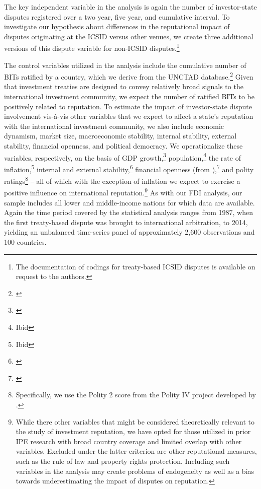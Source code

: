 \documentclass[12pt,onesided]{amsart}
\begin{document}
The key independent variable in the analysis is again the number of investor-state disputes registered over a two year, five year, and cumulative interval. To investigate our hypothesis about differences in the reputational impact of disputes originating at the ICSID versus other venues, we create three additional versions of this dispute variable for non-ICSID disputes.\footnote{The documentation of codings for treaty-based ICSID disputes is available on request to the authors.} 

 The control variables utilized in the analysis include the cumulative number of BITs ratified by a country, which we derive from the UNCTAD database.\footnote{\citet{unctad:2013c}} Given that investment treaties are designed to convey relatively broad signals to the international investment community, we expect the number of ratified BITs to be positively related to reputation. To estimate the impact of investor-state dispute involvement vis-\`{a}-vis other variables that we expect to affect a state's reputation with the international investment community, we also include economic dynamism, market size, macroeconomic stability, internal stability, external stability, financial openness, and political democracy. We operationalize these variables, respectively, on the basis of GDP growth,\footnote{\citet{worldbank:2013}} population,\footnote{Ibid} the rate of inflation,\footnote{Ibid} internal and external stability,\footnote{\citet{prs:2013}} financial openness (from \citeauthor{chinn:ito:2008}),\footnote{\citet{chinn:ito:2008}} and polity ratings\footnote{Specifically, we use the Polity 2 score from the Polity IV project developed by \citet{marshall2013polity}.} -- all of which with the exception of inflation we expect to exercise a positive influence on international reputation.\footnote{While there other variables that might be considered theoretically relevant to the study of investment reputation, we have opted for those utilized in prior IPE research with broad country coverage and limited overlap with other variables. Excluded under the latter criterion are other reputational measures, such as the rule of law and property rights protection. Including such variables in the analysis may create problems of endogeneity as well as a bias towards underestimating the impact of disputes on reputation.} As with our FDI analysis, our sample includes all lower and middle-income nations for which data are available. Again the time period covered by the statistical analysis ranges from 1987, when the first treaty-based dispute was brought to international arbitration, to 2014, yielding an unbalanced time-series panel of approximately 2,600 observations and 100 countries.
\end{document}
